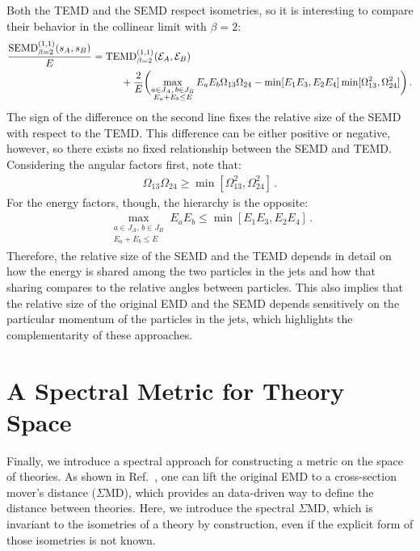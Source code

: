 \documentclass[letterpaper,11pt]{article}
\DeclareRobustCommand{\InRef}[1]{Ref.~\cite{#1}}
\begin{document}
Both the TEMD and the SEMD respect isometries, so it is interesting to compare their behavior in the collinear limit with $\beta = 2$:
%
\begin{align}
\frac{\text{SEMD}^{(1,1)}_{\beta=2}(s_A, s_B)}{E} &= \text{TEMD}^{(1,1)}_{\beta=2}({\cal E}_A,{\cal E}_B)\\
&
\hspace{1cm}+\frac{2}{E}\biggl(\max_{\substack{a\in J_A,\,b\in J_B\\E_a+E_b\leq E}}E_a E_b\Omega_{13}\Omega_{24}-  \min[E_1E_3,E_2E_4] \min[\Omega_{13}^2,\Omega_{24}^2]\biggr)\,.\nonumber
\end{align}
%
The sign of the difference on the second line fixes the relative size of the SEMD with respect to the TEMD.
%
This difference can be either positive or negative, however, so there exists no fixed relationship between the SEMD and TEMD.
%
Considering the angular factors first, note that:
%
\begin{align}
\Omega_{13}\Omega_{24}\geq \min[\Omega_{13}^2,\Omega_{24}^2]\,.
\end{align}
%
For the energy factors, though, the hierarchy is the opposite:
%
\begin{align}
\max_{\substack{a\in J_A,\,b\in J_B\\E_a+E_b\leq E}}E_a E_b \leq \min[E_1E_3,E_2E_4]\,.
\end{align}
%
Therefore, the relative size of the SEMD and the TEMD depends in detail on how the energy is shared among the two particles in the jets and how that sharing compares to the relative angles between particles.
%
This also implies that the relative size of the original EMD and the SEMD depends sensitively on the particular momentum of the particles in the jets, which highlights the complementarity of these approaches.


\section{A Spectral Metric for Theory Space}\label{sec:thspacemet}

Finally, we introduce a spectral approach for constructing a metric on the space of theories.
%
As shown in \InRef{Komiske:2020qhg}, one can lift the original EMD to a cross-section mover's distance ($\Sigma$MD), which provides an data-driven way to define the distance between theories.
%
Here, we introduce the spectral $\Sigma$MD, which is invariant to the isometries of a theory by construction, even if the explicit form of those isometries is not known.
\end{document}
